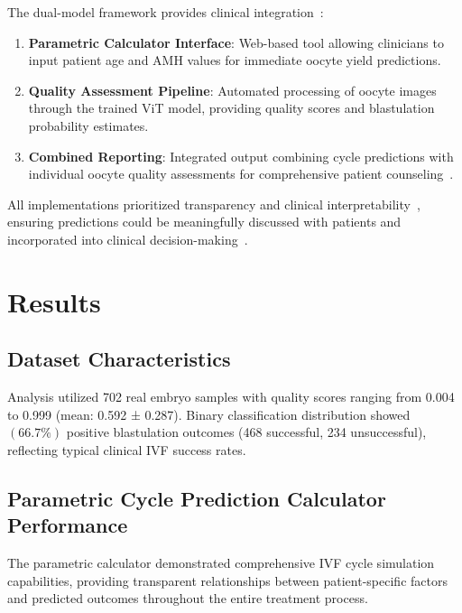 \documentclass[pdflatex,sn-basic]{sn-jnl}%
\begin{document}
The dual-model framework provides clinical integration~\cite{fda2022clinical}:

\begin{enumerate}
\item \textbf{Parametric Calculator Interface}: Web-based tool allowing clinicians to input patient age and AMH values for immediate oocyte yield predictions.

\item \textbf{Quality Assessment Pipeline}: Automated processing of oocyte images through the trained ViT model, providing quality scores and blastulation probability estimates.

\item \textbf{Combined Reporting}: Integrated output combining cycle predictions with individual oocyte quality assessments for comprehensive patient counseling~\cite{asrm2021counselors}.
\end{enumerate}

All implementations prioritized transparency and clinical interpretability~\cite{topol2019high}, ensuring predictions could be meaningfully discussed with patients and incorporated into clinical decision-making~\cite{beauchamp2019principles}. 

\section{Results}\label{sec:results}

\subsection{Dataset Characteristics}

Analysis utilized 702 real embryo samples with quality scores ranging from 0.004 to 0.999 (mean: 0.592 ± 0.287). Binary classification distribution showed $(66.7\%)$ positive blastulation outcomes (468 successful, 234 unsuccessful), reflecting typical clinical IVF success rates.

\subsection{Parametric Cycle Prediction Calculator Performance}

The parametric calculator demonstrated comprehensive IVF cycle simulation capabilities, providing transparent relationships between patient-specific factors and predicted outcomes throughout the entire treatment process.
\end{document}
